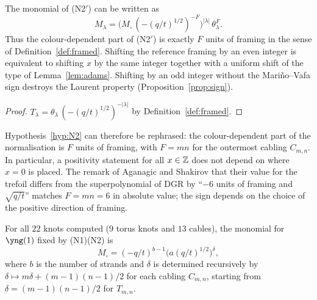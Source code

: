 \begin{proposition}\label{prop:N2-framing}
The monomial of {\rm(N2$'$)} can be written as
\[
M_\lambda=\bigl(M_\square\,(-(q/t)^{1/2})^{-F}\bigr)^{|\lambda|}\,\theta_\lambda^F .
\]
Thus the colour-dependent part of {\rm(N2$'$)} is exactly $F$ units of framing in the sense of Definition~\ref{def:framed}.
Shifting the reference framing by an even integer is equivalent to shifting $x$ by the same integer together with a uniform shift of the type of Lemma~\ref{lem:adams}.
Shifting by an odd integer without the Mari\~no--Vafa sign destroys the Laurent property (Proposition~\ref{prop:sign}).
\end{proposition}
\begin{proof}
$T_\lambda=\theta_\lambda\,(-(q/t)^{1/2})^{-|\lambda|}$ by Definition~\ref{def:framed}.
\end{proof}
Hypothesis~\ref{hyp:N2} can therefore be rephrased: the colour-dependent part of the normalisation is $F$ units of framing, with $F=mn$ for the outermost cabling $C_{m,n}$.
In particular, a positivity statement for all $x\in\mathbb{Z}$ does not depend on where $x=0$ is placed.
The remark of Aganagic and Shakirov \cite{Aganagic11} that their value for the trefoil differs from the superpolynomial of DGR by ``$-6$ units of framing and $\sqrt{q/t}$'' matches $F=mn=6$ in absolute value;
the sign depends on the choice of the positive direction of framing.

\begin{compresult}\label{cr:M}
For all $22$ knots computed ($9$ torus knots and $13$ cables), the monomial for $\yng(1)$ fixed by {\rm(N1)(N2)} is
\[
M_\square=(-q/t)^{b-1}\bigl(a(q/t)^{1/2}\bigr)^{\delta},
\]
where $b$ is the number of strands and $\delta$ is determined recursively by $\delta\mapsto m\delta+(m-1)(n-1)/2$ for each cabling $C_{m,n}$, starting from $\delta=(m-1)(n-1)/2$ for $T_{m,n}$.
\end{compresult}

